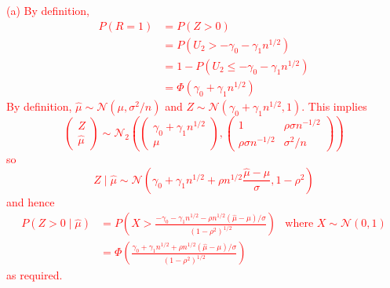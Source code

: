 \documentclass[12pt]{article}
\newcommand{\1}{\mathds 1}
\begin{document}
\begin{enumerate}
\textcolor{red}{
(a) By definition, 
\begin{align*}
	P(R = 1) &= P(Z > 0)\\
	&= P(U_2 > -\gamma_0 - \gamma_1 n^{1/2})\\
	&= 1 - P(U_2 \leq -\gamma_0 - \gamma_1 n^{1/2})\\
	&= \Phi(\gamma_0 + \gamma_1n^{1/2})
\end{align*}
By definition, $\hat\mu \sim \mathcal N(\mu, \sigma^2/n)$ and $Z \sim \mathcal N(\gamma_0 + \gamma_1n^{1/2}, 1)$. This implies 
\begin{equation*}
	\begin{pmatrix}
		Z \\ \hat\mu	
	\end{pmatrix} \sim \mathcal N_2\left(\begin{pmatrix}
		\gamma_0 + \gamma_1 n^{1/2} \\
		\mu
	\end{pmatrix}, \begin{pmatrix}
		1 & \rho\sigma n^{-1/2}\\
		\rho \sigma n^{-1/2} & \sigma^2 / n
	\end{pmatrix}\right)
\end{equation*}
so 
\begin{equation*}
	Z \mid \hat \mu \sim \mathcal N\left(\gamma_0 + \gamma_1 n^{1/2} +  \rho n^{1/2}\frac{\hat\mu - \mu}{\sigma}, 1 - \rho^2\right)
\end{equation*}
and hence 
\begin{align*}
	P(Z > 0 \mid \hat\mu) &= P\left(X > \frac{-\gamma_0 - \gamma_1n^{1/2}  - \rho n^{1/2}(\hat\mu - \mu) / \sigma}{(1 - \rho^2) ^{1/2} }\right) & \text{where $X \sim \mathcal N(0, 1)$}\\
	&= \Phi\left(\frac{\gamma_0 + \gamma_1 n^{1/2} + \rho n^{1/2} (\hat\mu - \mu)/\sigma}{(1 - \rho^2)^{1/2}}\right)
\end{align*}
as required.
}


\end{enumerate}
\end{document}
